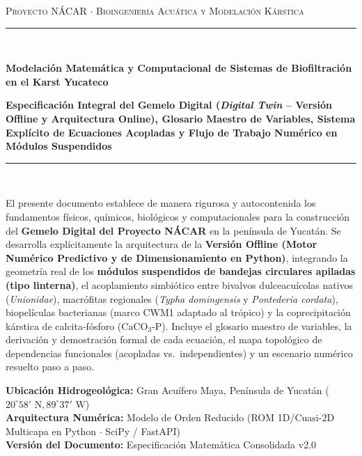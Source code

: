 \documentclass[11pt,letterpaper]{article}
\begin{document}
\begin{titlepage}
    \centering
    \vspace*{0.2cm}
    {\scshape\Large Proyecto NÁCAR $\cdot$ Bioingeniería Acuática y Modelación Kárstica \par}
    \vspace{0.4cm}
    \rule{\textwidth}{1.5pt}\\[0.35cm]
    {\Huge\bfseries\color{nacardark} Modelación Matemática y Computacional de Sistemas de Biofiltración en el Karst Yucateco \par}
    \vspace{0.3cm}
    {\large\bfseries\color{nacarblue} Especificación Integral del Gemelo Digital (\textit{Digital Twin} -- Versión Offline y Arquitectura Online), Glosario Maestro de Variables, Sistema Explícito de Ecuaciones Acopladas y Flujo de Trabajo Numérico en Módulos Suspendidos \par}
    \vspace{0.25cm}
    \rule{\textwidth}{1.5pt}\\[0.55cm]

    \begin{destacado}
    El presente documento establece de manera rigurosa y autocontenida los fundamentos físicos, químicos, biológicos y computacionales para la construcción del \textbf{Gemelo Digital del Proyecto NÁCAR} en la península de Yucatán. Se desarrolla explícitamente la arquitectura de la \textbf{Versión Offline (Motor Numérico Predictivo y de Dimensionamiento en Python)}, integrando la geometría real de los \textbf{módulos suspendidos de bandejas circulares apiladas (tipo linterna)}, el acoplamiento simbiótico entre bivalvos dulceacuícolas nativos (\textit{Unionidae}), macrófitas regionales (\textit{Typha domingensis} y \textit{Pontederia cordata}), biopelículas bacterianas (marco CWM1 adaptado al trópico) y la coprecipitación kárstica de calcita-fósforo ($\text{CaCO}_3\text{-P}$). Incluye el glosario maestro de variables, la derivación y demostración formal de cada ecuación, el mapa topológico de dependencias funcionales (acopladas vs.\ independientes) y un escenario numérico resuelto paso a paso.
    \end{destacado}

    \vfill
    {\normalsize \textbf{Ubicación Hidrogeológica:} Gran Acuífero Maya, Península de Yucatán ($20^\circ 58'\text{ N}, 89^\circ 37'\text{ W}$)\\[0.15cm]
    \textbf{Arquitectura Numérica:} Modelo de Orden Reducido (ROM 1D/Cuasi-2D Multicapa en Python $\cdot$ SciPy / FastAPI)\\[0.15cm]
    \textbf{Versión del Documento:} Especificación Matemática Consolidada v2.0}
\end{titlepage}
\end{document}
